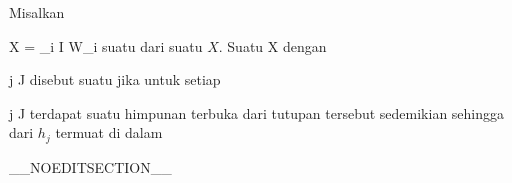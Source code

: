 {}
{

Misalkan

\mavergleichskette
{\vergleichskette
{ X
}
{ = }{ \bigcup_{i \in I} W_i
}
{  }{
}
{    }{
}
{   }{
}
}
{}{}{}
suatu
dari suatu
$X$. Suatu
 { X } {\R
} {}
dengan

\mavergleichskette
{\vergleichskette
{ j
}
{ \in }{ J
}
{  }{
}
{    }{
}
{   }{
}
}
{}{}{}
disebut suatu  jika untuk setiap

\mavergleichskette
{\vergleichskette
{ j
}
{ \in }{ J
}
{  }{
}
{    }{
}
{   }{
}
}
{}{}{}
terdapat suatu himpunan terbuka
 dari tutupan tersebut sedemikian sehingga
dari $h_j$ termuat di dalam

}

__NOEDITSECTION__

